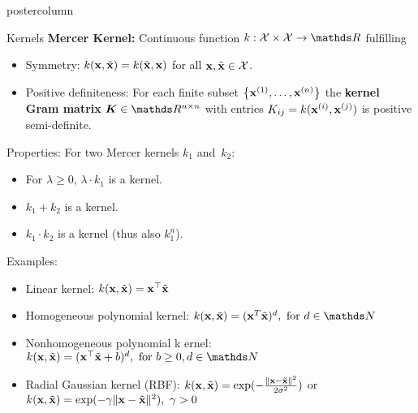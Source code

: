 \documentclass{beamer}
\begin{document}
\begin{frame}[fragile]{}
\begin{columns}
\begin{column}{.31\textwidth}
\begin{beamercolorbox}[center]{postercolumn}
\begin{minipage}{.98\textwidth}
{						\begin{myblock}{Kernels}
							\textbf{Mercer Kernel:} Continuous function
							$ k : \Xspace \times \Xspace \to \R $ fulfilling
							\begin{itemize}
								\setlength{\itemindent}{+.3in}
							\item Symmetry: $k(\mathbf{x}, \tilde {\mathbf{x}}) = k(\tilde {\mathbf{x}}, \mathbf{x})$ for all
							$\mathbf{x}, \tilde {\mathbf{x}} \in \mathcal{X}$.
							\item Positive definiteness: For each finite subset $\left\{\mathbf{x}^{(1)}, \dots, \mathbf{x}^{(n)}\right\}$
							the \textbf{kernel Gram matrix} $\bm{K} \in \R^{n \times n}$ with entries
							$K_{ij} = k(\mathbf{x}^{(i)}, \mathbf{x}^{(j)})$ is positive semi-definite.
							\end{itemize}
							Properties: For two Mercer kernels $k_1$ and~$k_2$:
							\begin{itemize}
								\setlength{\itemindent}{+.3in}
								\item For $\lambda \geq 0$, $\lambda \cdot k_1$ is a kernel.
								\item $k_1 + k_2$ is a kernel.
								\item $k_1 \cdot k_2$ is a kernel (thus also $k_1^n$).
							\end{itemize}
							Examples:
							\begin{itemize}
								\setlength{\itemindent}{+.3in}
								\item Linear kernel: $k(\mathbf{x}, \tilde {\mathbf{x}}) = \mathbf{x}^\top \tilde {\mathbf{x}}$
								\item Homogeneous polynomial kernel:
								$ k(\xv, \xtil) = (\xv^T \xtil)^d, \text{ for } d \in \N$
								\item Nonhomogeneous polynomial k	ernel: $k(\xv, \tilde \xv) = (\xv^\top \tilde \xv + b)^d, \text{ for } b\geq 0, d \in \N$
								\item Radial Gaussian kernel (RBF):
								$k(\mathbf{x}, \tilde {\mathbf{x}}) = \exp(-\frac{\|\mathbf{x} - \tilde {\mathbf{x}}\|^2}{2\sigma^2})$ 
								or 
								$k(\mathbf{x}, \tilde {\mathbf{x}}) = \exp(-\gamma \|\mathbf{x} - \tilde {\mathbf{x}}\|^2), ~ \gamma>0$
							\end{itemize}
						\end{myblock} 


}
\end{minipage}
\end{beamercolorbox}
\end{column}
\end{columns}
\end{frame}
\end{document}
